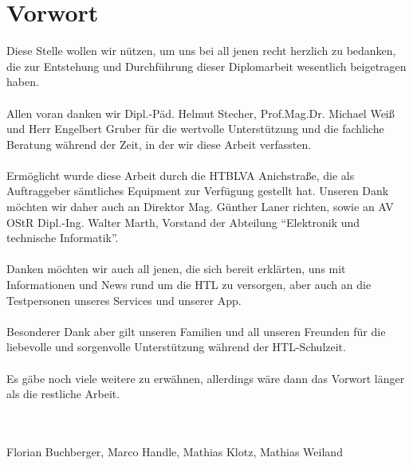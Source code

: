\chapter{Vorwort}


Diese Stelle wollen wir nützen, um uns bei all jenen recht herzlich zu bedanken, die zur Entstehung und Durchführung dieser Diplomarbeit wesentlich beigetragen haben.\\
\\
Allen voran danken wir Dipl.-Päd. Helmut Stecher, Prof.Mag.Dr. Michael Weiß und Herr Engelbert Gruber für die wertvolle Unterstützung und die fachliche Beratung während der Zeit, in der wir diese Arbeit verfassten.\\
\\
Ermöglicht wurde diese Arbeit durch die HTBLVA Anichstraße, die als Auftraggeber sämtliches Equipment zur Verfügung gestellt hat. Unseren Dank möchten wir daher auch an Direktor Mag. Günther Laner richten, sowie an AV OStR Dipl.-Ing. Walter Marth, Vorstand der Abteilung \enquote{Elektronik und technische Informatik}.\\
\\
Danken möchten wir auch all jenen, die sich bereit erklärten, uns mit Informationen und News rund um die HTL zu versorgen, aber auch an die Testpersonen unseres Services und unserer App.\\
\\
Besonderer Dank aber gilt unseren Familien und all unseren Freunden für die liebevolle und sorgenvolle Unterstützung während der HTL-Schulzeit.\\
\\
Es gäbe noch viele weitere zu erwähnen, allerdings wäre dann das Vorwort länger als die restliche Arbeit.\\
\\
\\
\begin{flushright}
Florian Buchberger, Marco Handle, Mathias Klotz, Mathias Weiland
\end{flushright}